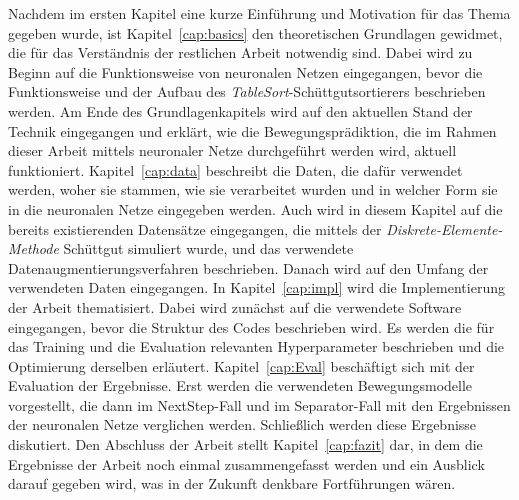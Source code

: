 Nachdem im ersten Kapitel eine kurze Einführung und Motivation für das Thema gegeben wurde, 
ist Kapitel~\ref{cap:basics} den theoretischen Grundlagen gewidmet, die für das Verständnis der restlichen Arbeit notwendig sind.
Dabei wird zu Beginn auf die Funktionsweise von neuronalen Netzen eingegangen, 
bevor die Funktionsweise und der Aufbau des \textit{TableSort}-Schüttgutsortierers beschrieben werden.
Am Ende des Grundlagenkapitels wird auf den aktuellen Stand der Technik eingegangen und erklärt, wie die Bewegungsprädiktion, 
die im Rahmen dieser Arbeit mittels neuronaler Netze durchgeführt werden wird, aktuell funktioniert.
Kapitel~\ref{cap:data} beschreibt die Daten, die dafür verwendet werden,
woher sie stammen, wie sie verarbeitet wurden und in welcher Form sie in die neuronalen Netze eingegeben werden.
Auch wird in diesem Kapitel auf die bereits existierenden Datensätze eingegangen, die mittels der \textit{Diskrete-Elemente-Methode} Schüttgut simuliert wurde,
und das verwendete Datenaugmentierungsverfahren beschrieben.
Danach wird auf den Umfang der verwendeten Daten eingegangen.
In Kapitel~\ref{cap:impl} wird die Implementierung der Arbeit thematisiert.
Dabei wird zunächst auf die verwendete Software eingegangen, bevor die Struktur des Codes beschrieben wird.
Es werden die für das Training und die Evaluation relevanten Hyperparameter beschrieben und die Optimierung derselben erläutert.
Kapitel~\ref{cap:Eval} beschäftigt sich mit der Evaluation der Ergebnisse.
% 
Erst werden die verwendeten Bewegungsmodelle vorgestellt, die dann im NextStep-Fall und im Separator-Fall mit den Ergebnissen der neuronalen Netze verglichen werden.
Schließlich werden diese Ergebnisse diskutiert.
% 
Den Abschluss der Arbeit stellt Kapitel~\ref{cap:fazit} dar, in dem die Ergebnisse der Arbeit noch einmal zusammengefasst werden 
und ein Ausblick darauf gegeben wird, was in der Zukunft denkbare Fortführungen wären.

